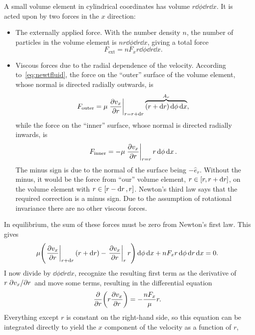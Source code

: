 \documentclass[11pt,british,a4paper]{report}
\begin{document}
A small volume element in cylindrical coordinates has volume \(r\dd{\phi}\dd{r}\dd{x}\). It is acted upon by two forces in the \(x\) direction:
\begin{itemize}
    \item The externally applied force. With the number density \(n\), the number of particles in the volume element is \(nr\dd{\phi}\dd{r}\dd{x}\), giving a total force
        \begin{equation}
            F_{\text{ext}} = nF_xr\dd{\phi}\dd{r}\dd{x}.
        \end{equation}
    \item
        Viscous forces due to the radial dependence of the velocity. According to~\vref{eq:newtfluid}, the force on the ``outer'' surface of the volume element, whose normal is directed radially outwards, is
        \begin{equation}
            F_{\text{outer}} = \mu \eval{\pdv{v_x}{r}}_{r=r+\dd{r}}\overbrace{\qty(r+\dd{r})\dd{\phi}\dd{x}}^{A_r},
        \end{equation}
        while the force on the ``inner'' surface, whose normal is directed radially inwards, is
        \begin{equation}
            F_{\text{inner}} = -\mu \eval{\pdv{v_x}{r}}_{r=r}r\dd{\phi}\dd{x}.
        \end{equation}
        The minus sign is due to the normal of the surface being \(-\hat{e}_r\). Without the minus, it would be the force from ``our'' volume element, \(r\in\qty[r,r+\dd{r}]\), on the volume element with \(r\in\qty[r-\dd{r},r]\). Newton's third law says that the required correction is a minus sign. Due to the assumption of rotational invariance there are no other viscous forces.
\end{itemize}
In equilibrium, the sum of these forces must be zero from Newton's first law. This gives
\begin{equation}
    \mu\qty(\eval{\pdv{v_x}{r}}_{r+\dd{r}}\qty(r+\dd{r})-\eval{\pdv{v_x}{r}}_{r}r)\dd{\phi}\dd{x} + nF_xr\dd{\phi}\dd{r}\dd{x} = 0.
\end{equation}
I now divide by \(\dd{\phi}\dd{r}\dd{x}\), recognize the resulting first term as the derivative of \(r\pdv*{v_x}{r}\) and move some terms, resulting in the differential equation
\begin{equation}
    \pdv{r}(r\pdv{v_x}{r}) = -\frac{nF_x}{\mu}r.
\end{equation}
Everything except \(r\) is constant on the right-hand side, so this equation can be integrated directly to yield the \(x\) component of the velocity as a function of \(r\),
\end{document}
